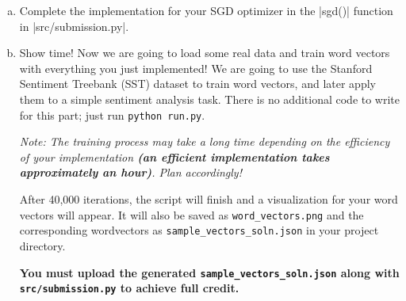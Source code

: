 \begin{enumerate}[(a)]
    \item {} Complete the implementation for your SGD optimizer in the |sgd()| function in |src/submission.py|.
    
    \item {} Show time! Now we are going to load some real data and train word vectors with everything you just implemented! We are going to use the Stanford Sentiment Treebank (SST) dataset to train word vectors, and later apply them to a simple sentiment analysis task. There is no additional code to write for this part; just run \texttt{python run.py}.
            
    \emph{Note: The training process may take a long time depending on the efficiency of your implementation \textbf{(an efficient implementation takes approximately an hour)}. Plan accordingly!}

    
    After 40,000 iterations, the script will finish and a visualization for your word vectors will appear. It will also be saved as \texttt{word\_vectors.png} and the corresponding wordvectors as \texttt{sample\_vectors\_soln.json} in your project directory.

    \textbf{You must upload the generated \texttt{sample\_vectors\_soln.json} along with \texttt{src/submission.py} to achieve full credit.}
\end{enumerate}
